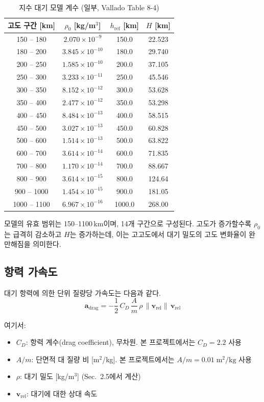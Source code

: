 \documentclass[11pt]{article}
\begin{document}
\begin{table}[h]
\centering
\caption{지수 대기 모델 계수 (일부, Vallado \cite{Vallado2013} Table 8-4)}
\label{tab:atmo_params}
\begin{tabular}{cccc}
\toprule
고도 구간 [km] & $\rho_0$ [kg/m$^3$] & $h_{\text{ref}}$ [km] & $H$ [km] \\
\midrule
150 -- 180 & $2.070 \times 10^{-9}$ & 150.0 & 22.523 \\
180 -- 200 & $3.845 \times 10^{-10}$ & 180.0 & 29.740 \\
200 -- 250 & $1.585 \times 10^{-10}$ & 200.0 & 37.105 \\
250 -- 300 & $3.233 \times 10^{-11}$ & 250.0 & 45.546 \\
300 -- 350 & $8.152 \times 10^{-12}$ & 300.0 & 53.628 \\
350 -- 400 & $2.477 \times 10^{-12}$ & 350.0 & 53.298 \\
400 -- 450 & $8.484 \times 10^{-13}$ & 400.0 & 58.515 \\
450 -- 500 & $3.027 \times 10^{-13}$ & 450.0 & 60.828 \\
500 -- 600 & $1.514 \times 10^{-13}$ & 500.0 & 63.822 \\
600 -- 700 & $3.614 \times 10^{-14}$ & 600.0 & 71.835 \\
700 -- 800 & $1.170 \times 10^{-14}$ & 700.0 & 88.667 \\
800 -- 900 & $3.614 \times 10^{-15}$ & 800.0 & 124.64 \\
900 -- 1000 & $1.454 \times 10^{-15}$ & 900.0 & 181.05 \\
1000 -- 1100 & $6.967 \times 10^{-16}$ & 1000.0 & 268.00 \\
\bottomrule
\end{tabular}
\end{table}

모델의 유효 범위는 150--1100\,km이며, 14개 구간으로 구성된다. 고도가 증가할수록 $\rho_0$는 급격히 감소하고 $H$는 증가하는데, 이는 고고도에서 대기 밀도의 고도 변화율이 완만해짐을 의미한다.


\subsection{항력 가속도}

대기 항력에 의한 단위 질량당 가속도는 다음과 같다.
\[
\mathbf{a}_{\text{drag}} = -\frac{1}{2}\,C_D\,\frac{A}{m}\,\rho\,\|\mathbf{v}_{\text{rel}}\|\,\mathbf{v}_{\text{rel}}
\]

여기서:
\begin{itemize}
  \item $C_D$: 항력 계수(drag coefficient), 무차원. 본 프로젝트에서는 $C_D = 2.2$ 사용
  \item $A/m$: 단면적 대 질량 비 [m$^2$/kg]. 본 프로젝트에서는 $A/m = 0.01\;\text{m}^2/\text{kg}$ 사용
  \item $\rho$: 대기 밀도 [kg/m$^3$] (Sec.~2.5에서 계산)
  \item $\mathbf{v}_{\text{rel}}$: 대기에 대한 상대 속도
\end{itemize}
\end{document}
